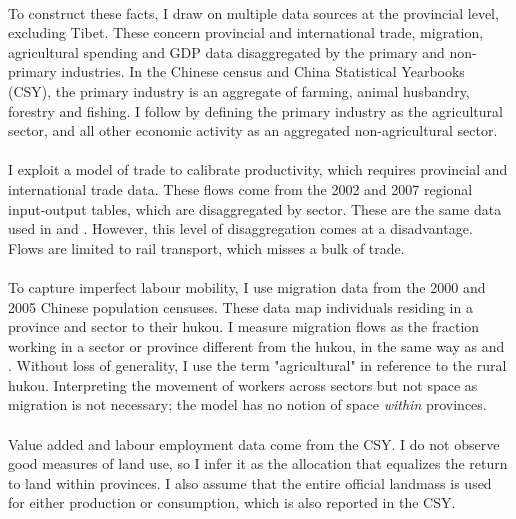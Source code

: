 \documentclass[]{article}
\theoremstyle{plain}
\begin{document}
\paragraph*{}
To construct these facts, I draw on multiple data sources at the provincial level, excluding Tibet. These concern provincial and international trade, migration, agricultural spending and GDP data disaggregated by the primary and non-primary industries. In the Chinese census and China Statistical Yearbooks (CSY), the primary industry is an aggregate of farming, animal husbandry, forestry and fishing. I follow \cite{hao2020} by defining the primary industry as the agricultural sector, and all other economic activity as an aggregated non-agricultural sector.
\paragraph*{}
I exploit a model of trade to calibrate productivity, which requires provincial and international trade data. These flows come from the 2002 and 2007 regional input-output tables, which are disaggregated by sector. These are the same data used in \cite{Fan2019} and \cite{tombezhu}. However, this level of disaggregation comes at a disadvantage. Flows are limited to rail transport, which misses a bulk of trade. 
\paragraph*{}
To capture imperfect labour mobility, I use migration data from the 2000 and 2005 Chinese population censuses. These data map individuals residing in a province and sector to their hukou. I measure migration flows as the fraction working in a sector or province different from the hukou, in the same way as \cite{tombezhu} and \cite{hao2020}. Without loss of generality, I use the term "agricultural" in reference to the rural hukou. Interpreting the movement of workers across sectors but not space as migration is not necessary; the model has no notion of space \textit{within} provinces.
\paragraph*{}
Value added and labour employment data come from the CSY.  I do not observe good measures of land use, so I infer it as the allocation that equalizes the return to land within provinces. I also assume that the entire official landmass is used for either production or consumption, which is also reported in the CSY. 
\end{document}
